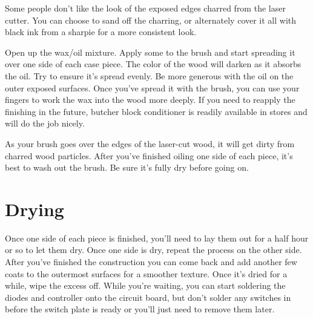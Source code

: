 \documentclass{article}
\begin{document}
\vspace{1em}

Some people don't like the look of the exposed edges charred from the
laser cutter. You can choose to sand off the charring, or alternately
cover it all with black ink from a sharpie for a more consistent look.

\vspace{1em}

Open up the wax/oil mixture. Apply some to the brush and start
spreading it over one side of each case piece. The color of the wood
will darken as it absorbs the oil. Try to ensure it's spread
evenly. Be more generous with the oil on the outer exposed
surfaces. Once you've spread it with the brush, you can use your
fingers to work the wax into the wood more deeply. If you need to
reapply the finishing in the future, butcher block conditioner is
readily available in stores and will do the job nicely.

\vspace{1em}
\noindent{}
\vspace{1em}

As your brush goes over the edges of the laser-cut wood, it will get
dirty from charred wood particles. After you've finished oiling one
side of each piece, it's best to wash out the brush. Be sure it's
fully dry before going on.

\section{Drying}

Once one side of each piece is finished, you'll need to lay them out
for a half hour or so to let them dry. Once one side is dry, repeat
the process on the other side. After you've finished the construction
you can come back and add another few coats to the outermost surfaces
for a smoother texture. Once it's dried for a while, wipe the excess
off. While you're waiting, you can start soldering the diodes and
controller onto the circuit board, but don't solder any switches in
before the switch plate is ready or you'll just need to remove them
later.
\end{document}
